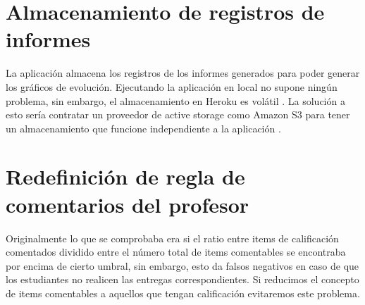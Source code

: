 \section{Almacenamiento de registros de informes}
La aplicación almacena los registros de los informes generados para poder generar los gráficos de evolución. Ejecutando la aplicación en local no supone ningún problema, sin embargo, el almacenamiento en Heroku es volátil \cite{ephemeralHeroku-2018}. La solución a esto sería contratar un proveedor de active storage como Amazon S3 para tener un almacenamiento que funcione independiente a la aplicación \cite{activeStorageOverview-2019}.

\section{Redefinición de regla de comentarios del profesor}
Originalmente lo que se comprobaba era si el ratio entre items de calificación comentados dividido entre el número total de items comentables se encontraba por encima de cierto umbral, sin embargo, esto da falsos negativos en caso de que los estudiantes no realicen las entregas correspondientes. Si reducimos el concepto de items comentables a aquellos que tengan calificación evitaremos este problema.
